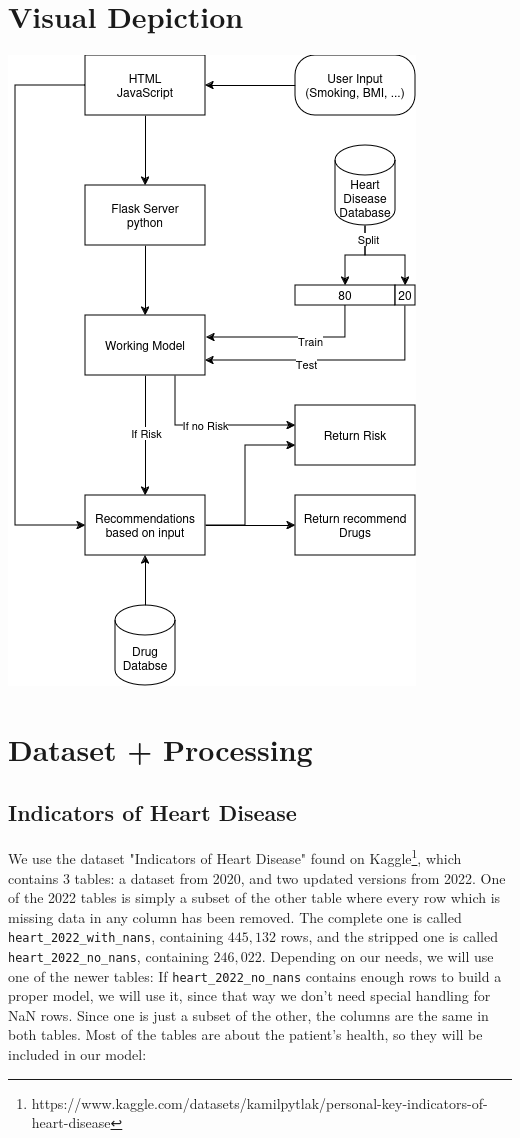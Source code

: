 \documentclass{article}
\begin{document}
   


\section{Visual Depiction}
\begin{center} 
\includegraphics[scale=.75]{Hearth_death.drawio(1).png}
\end{center}

\section{Dataset + Processing}

\subsection{Indicators of Heart Disease}
We use the dataset "Indicators of Heart Disease" found on Kaggle\footnote{https://www.kaggle.com/datasets/kamilpytlak/personal-key-indicators-of-heart-disease},
which contains 3 tables: a dataset from 2020,
and two updated versions from 2022.
One of the 2022 tables is simply a subset of the other table where every row which is missing data in any column has been removed.
The complete one is called \texttt{heart\_2022\_with\_nans}, containing $445,132$ rows,
and the stripped one is called \texttt{heart\_2022\_no\_nans}, containing $246,022$.
Depending on our needs, we will use one of the newer tables:
If \texttt{heart\_2022\_no\_nans} contains enough rows to build a proper model,
we will use it, since that way we don't need special handling for NaN rows.
Since one is just a subset of the other, the columns are the same in both tables.
Most of the tables are about the patient's health, so they will be included in our model:
\end{document}
